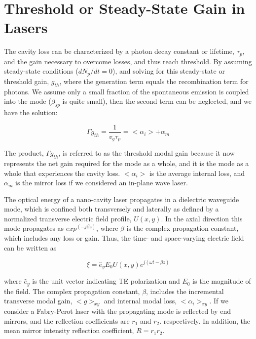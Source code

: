 \section{Threshold or Steady-State Gain in Lasers} \label{sec:conditionals}

The cavity loss can be characterized by a photon decay constant or lifetime,
$\tau_p$, and the gain necessary to overcome losses, and thus reach threshold.
By assuming steady-state conditions (\ie $dN_p/dt = 0$), and solving for this
steady-state or threshold gain, $g_{th}$, where the generation term equals the
recombination term for photons. We assume only a small fraction of the
spontaneous emission is coupled into the mode (\ie $\beta_{sp}$ is quite
small), then the second term can be neglected, and we have the solution:

\begin{equation}
  \Gamma{g_{th}} = \frac{1}{v_g\tau_p} = <\alpha_i> + \alpha_m
\end{equation}

The product, $\Gamma{g_{th}}$, is referred to as the threshold modal gain
because it now represents the net gain required for the mode as a whole, and it
is the mode as a whole that experiences the cavity loss. $<\alpha_i>$ is the
average internal loss, and $\alpha_m$ is the mirror loss if we considered an
in-plane wave laser.

The optical energy of a nano-cavity laser propagates in a dielectric waveguide
mode, which is confined both transversely and laterally as defined by a
normalized transverse electric field profile, $U(x,y)$. In the axial direction
this mode propagates as $exp^{(-j\beta z)}$, where $\beta$ is the complex
propagation constant, which includes any loss or gain. Thus, the time- and
space-varying electric field can be written as

\begin{equation}
  \xi = \hat{e}_{y}E_{0}U(x,y)e^{j(\omega t- \beta z)}
\end{equation}

where $\hat{e}_y$ is the unit vector indicating TE polarization and $E_0$ is
the magnitude of the field. The complex propagation constant, $\beta$, includes
the incremental transverse modal gain, $<g>_{xy}$ and internal modal loss,
$<\alpha_i>_{xy}$. If we consider a Fabry-Perot laser with the propagating mode
is reflected by end mirrors, and the reflection coefficients are $r_1$ and
$r_2$. respectively. In addition, the mean mirror intensity reflection coefficient, $R = r_1r_2$.

